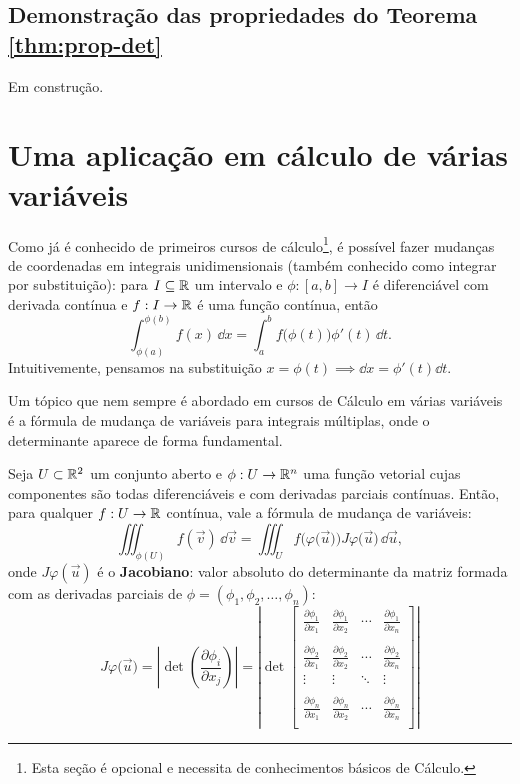 \documentclass[../livro.tex]{subfiles}  %
\begin{document}
\subsection{Demonstração das propriedades do Teorema \ref*{thm:prop-det}}

Em construção.

\section{Uma aplicação em cálculo de várias variáveis}

Como já é conhecido de primeiros cursos de cálculo\footnote{Esta seção é opcional e necessita de conhecimentos básicos de Cálculo.}, é possível fazer mudanças de coordenadas em integrais unidimensionais (também conhecido como integrar por substituição): para $I \subseteq \mathbb{R}$ um intervalo e $\phi : [a,b] \to I$ é diferenciável com derivada contínua e $f: I \to \mathbb{R}$ é uma função contínua, então
\[
\int_{\phi (a)}^{\phi (b)} f(x) \, \dd x = \int_{a}^{b} f \big(\phi (t)\big) \phi'(t) \, \dd t.
\] Intuitivemente, pensamos na substituição $x = \phi (t) \implies \dd x = \phi' (t)\dd t$.

Um tópico que nem sempre é abordado em cursos de Cálculo em várias variáveis é a fórmula de mudança de variáveis para integrais múltiplas, onde o determinante aparece de forma fundamental.

\begin{theorem}
Seja $U \subset \mathbb{R}^2$ um conjunto aberto e $\phi: U \to \mathbb{R}^n$ uma função vetorial cujas componentes são todas diferenciáveis e com derivadas parciais contínuas. Então, para qualquer $f: U \to \mathbb{R}$ contínua, vale a fórmula de mudança de variáveis:
\[
\iiint_{\phi (U)}  f(\vec{v}) \, \dd \vec{v} =  \iiint _{U} f\big(\varphi \big(\vec{u}\big)\big) J\varphi \big(\vec{u}\big) \, \dd\vec{u},
\] onde $J\varphi (\vec{u})$ é o \textbf{Jacobiano}: valor absoluto do determinante da matriz formada com as derivadas parciais de $\phi = (\phi_1, \phi_2, \dots, \phi_n)$:
\[
J\varphi \big(\vec{u}\big) = \left|
\det \left( \frac{\partial \phi_i}{\partial x_j} \right) 
\right| = \left|
\det 
\begin{bmatrix}
\frac{\partial \phi_1}{\partial x_1} & \frac{\partial \phi_1}{\partial x_2} & \cdots & \frac{\partial \phi_1}{\partial x_n} \\
 &&& \\
\frac{\partial \phi_2}{\partial x_1} & \frac{\partial \phi_2}{\partial x_2} & \cdots & \frac{\partial \phi_2}{\partial x_n} \\
\vdots & \vdots & \ddots & \vdots \\
 &&& \\
\frac{\partial \phi_n}{\partial x_1} & \frac{\partial \phi_n}{\partial x_2} & \cdots & \frac{\partial \phi_n}{\partial x_n} \\
\end{bmatrix}
\right| 
\]
\end{theorem}
\end{document}
